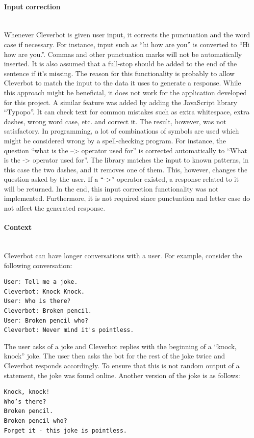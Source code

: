 \documentclass[12pt,a4paper]{article}
\newcommand{\myparagraph}[1]{\paragraph{#1}\mbox{}\\}
\begin{document}
\myparagraph{Input correction}
Whenever Cleverbot is given user input, it corrects the punctuation and the word case if necessary. For instance, input such as “hi how are you” is converted to “Hi how are you.”. Commas and other punctuation marks will not be automatically inserted. It is also assumed that a full-stop should be added to the end of the sentence if it’s missing. The reason for this functionality is probably to allow Cleverbot to match the input to the data it uses to generate a response. While this approach might be beneficial, it does not work for the application developed for this project. A similar feature was added by adding the JavaScript library “Typopo”. It can check text for common mistakes such as extra whitespace, extra dashes, wrong word case, etc. and correct it. The result, however, was not satisfactory. In programming, a lot of combinations of symbols are used which might be considered wrong by a spell-checking program. For instance, the question “what is the --> operator used for” is corrected automatically to “What is the -> operator used for”. The library matches the input to known patterns, in this case the two dashes, and it removes one of them. This, however, changes the question asked by the user. If a “->” operator existed, a response related to it will be returned. In the end, this input correction functionality was not implemented. Furthermore, it is not required since punctuation and letter case do not affect the generated response.

\myparagraph{Context}
Cleverbot can have longer conversations with a user. For example, consider the following conversation:

\begin{verbatim}
User: Tell me a joke.
Cleverbot: Knock Knock.
User: Who is there?
Cleverbot: Broken pencil.
User: Broken pencil who?
Cleverbot: Never mind it's pointless.
\end{verbatim}

The user asks of a joke and Cleverbot replies with the beginning of a “knock, knock” joke. The user then asks the bot for the rest of the joke twice and Cleverbot responds accordingly. To ensure that this is not random output of a statement, the joke was found online. Another version of the joke is as follows:

\begin{verbatim}
Knock, knock!
Who’s there?
Broken pencil.
Broken pencil who?
Forget it - this joke is pointless. 
\end{verbatim}
\end{document}
